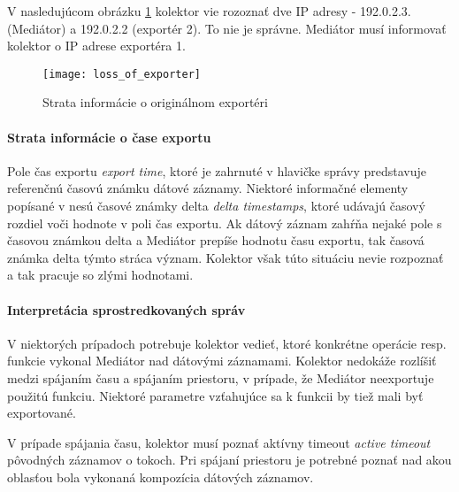 V nasledujúcom obrázku \ref{o:loss_of_exporter} kolektor vie rozoznať dve IP adresy - 192.0.2.3. (Mediátor) 
a 192.0.2.2 (exportér 2). To nie je správne. Mediátor musí informovať kolektor o IP adrese exportéra 1.

\begin{figure}[ht!]
\centering
\texttt{[image: loss\_of\_exporter]}
\caption{Strata informácie o originálnom exportéri}\label{o:loss_of_exporter}
\end{figure}

\paragraph{Strata informácie o čase exportu} \label{sec:loss_time}

Pole čas exportu \emph{export time}, ktoré je zahrnuté v hlavičke správy predstavuje referenčnú 
časovú známku dátové záznamy. Niektoré informačné elementy popísané v \citep{rfc5102} nesú 
časové známky delta \emph{delta timestamps}, ktoré udávajú časový rozdiel voči hodnote v poli 
čas exportu. Ak dátový záznam zahŕňa nejaké pole s časovou známkou delta a Mediátor prepíše hodnotu 
času exportu,  tak časová známka delta týmto stráca význam. Kolektor však túto situáciu nevie 
rozpoznať a tak pracuje so zlými hodnotami.

%


\paragraph{Interpretácia sprostredkovaných správ}


V niektorých prípadoch potrebuje kolektor vedieť, ktoré konkrétne operácie resp. funkcie vykonal Mediátor 
nad dátovými záznamami. Kolektor nedokáže rozlíšiť medzi spájaním času a spájaním priestoru, v prípade, že 
Mediátor neexportuje použitú funkciu. Niektoré parametre vzťahujúce sa k funkcii by tiež mali byť 
exportované. 

V prípade spájania času, kolektor musí poznať aktívny timeout \emph{active timeout} 
pôvodných záznamov o tokoch. Pri spájaní priestoru je potrebné poznať nad akou oblasťou bola 
vykonaná kompozícia dátových záznamov.\citep{rfc5982}

%

